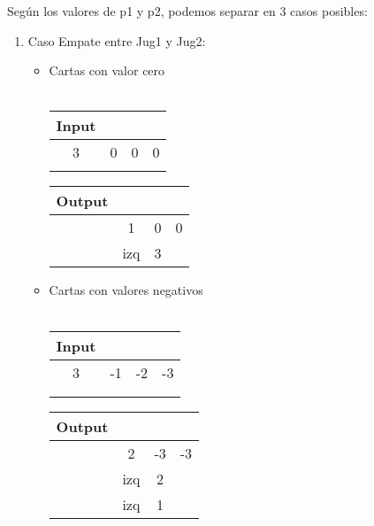 \documentclass[11pt, a4paper, twoside]{article}
\begin{document}
Según los valores de p1 y p2, podemos separar en 3 casos posibles: 
				
\begin{enumerate}
	\item Caso Empate entre Jug1 y Jug2:

		\begin{itemize}
			\item Cartas con valor cero \\
			\\
				\begin{minipage}{0.4\textwidth}
					  \begin{tabular}{cccc}
						   Input \\
						   \hline
						   3 & 0 & 0 & 0 \\
						   \\
					  \end{tabular}
				\end{minipage} 
				\begin{minipage}{0.3\textwidth}
					  \begin{tabular}{cccc}
						  Output\\
						  \hline
						  & 1   & 0  & 0 \\
						  & izq & 3  & \\
					  \end{tabular}
				\end{minipage} 
				
			\item	Cartas con valores negativos \\
			\\
				\begin{minipage}{0.4\textwidth}
					  \begin{tabular}{cccc}
						   Input\\
						   \hline
						   3 & -1 & -2 & -3 \\
						   \\
						   \\
					  \end{tabular}
				\end{minipage} 
				\begin{minipage}{0.3\textwidth}
					  \begin{tabular}{cccc}
						  Output \\
                          \hline
  						   & 2   & -3  & -3 \\
						   & izq & 2  & \\
						   & izq & 1  & \\
					  \end{tabular}
				\end{minipage}
		\end{itemize}
		

\end{enumerate}
\end{document}
